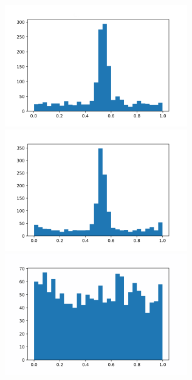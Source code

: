 \documentclass[12pt,twoside]{report}
\begin{document}
\begin{figure}[H]
\begin{center}
\begin{minipage}{0.45\linewidth}
\includegraphics[width=\linewidth]{figures/hist.png}
\end{minipage}%
\hfill
\begin{minipage}{0.45\linewidth}
\includegraphics[width=\linewidth]{figures/hist3.png}
\end{minipage}
\end{center}
\begin{center}
\begin{minipage}{0.45\linewidth}
\includegraphics[width=\linewidth]{figures/hist4.png}

\end{minipage}
\end{center}
\end{figure}
\end{document}
